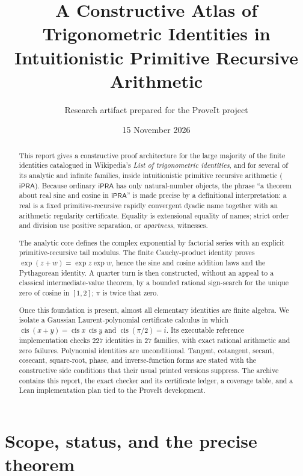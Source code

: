 \documentclass[11pt]{article}
\title{A Constructive Atlas of Trigonometric Identities in Intuitionistic Primitive Recursive Arithmetic}
\author{Research artifact prepared for the ProveIt project}
\date{15 November 2026}
\theoremstyle{definition}
\newcommand{\iPRA}{\mathsf{iPRA}}
\newcommand{\cis}{\operatorname{cis}}
\newcommand{\code}[1]{\texttt{\detokenize{#1}}}
\begin{document}
\maketitle

\begin{abstract}
This report gives a constructive proof architecture for the large majority of the
finite identities catalogued in Wikipedia's \emph{List of trigonometric identities},
and for several of its analytic and infinite families, inside intuitionistic
primitive recursive arithmetic (\(\iPRA\)).  Because ordinary \(\iPRA\) has only
natural-number objects, the phrase ``a theorem about real sine and cosine in
\(\iPRA\)'' is made precise by a definitional interpretation: a real is a fixed
primitive-recursive rapidly convergent dyadic name together with an arithmetic
regularity certificate.  Equality is extensional equality of names; strict order
and division use positive separation, or \emph{apartness}, witnesses.

The analytic core defines the complex exponential by factorial series with an
explicit primitive-recursive tail modulus.  The finite Cauchy-product identity
proves \(\exp(z+w)=\exp z\exp w\), hence the sine and cosine addition laws and the
Pythagorean identity.  A quarter turn is then constructed, without an appeal to a
classical intermediate-value theorem, by a bounded rational sign-search for the
unique zero of cosine in \([1,2]\); \(\pi\) is twice that zero.

Once this foundation is present, almost all elementary identities are finite
algebra.  We isolate a Gaussian Laurent-polynomial certificate calculus in which
\(\cis(x+y)=\cis x\,\cis y\) and \(\cis(\pi/2)=i\).  Its executable reference
implementation checks 227 identities in 27 families, with exact rational
arithmetic and zero failures.  Polynomial identities are unconditional.
Tangent, cotangent, secant, cosecant, square-root, phase, and inverse-function
forms are stated with the constructive side conditions that their usual printed
versions suppress.  The archive contains this report, the exact checker and its
certificate ledger, a coverage table, and a Lean implementation plan tied to the
ProveIt \code{ConciseIPRA} development.
\end{abstract}

\tableofcontents

\section{Scope, status, and the precise theorem}
\end{document}
